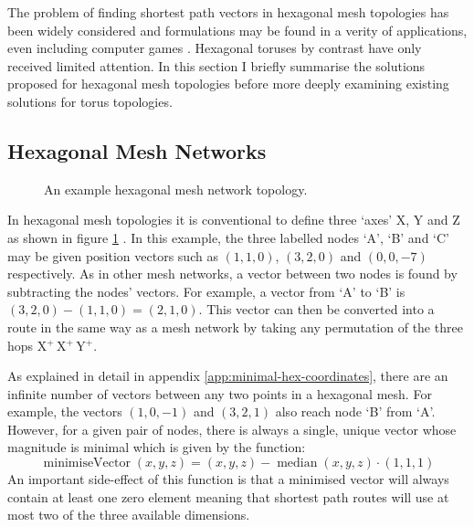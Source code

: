 		The problem of finding shortest path vectors in hexagonal mesh topologies
		has been widely considered and formulations may be found in a verity of
		applications, even including computer games \cite{patel15}. Hexagonal
		toruses by contrast have only received limited attention. In this section I
		briefly summarise the solutions proposed for hexagonal mesh topologies
		before more deeply examining existing solutions for torus topologies.
		
		\subsection{Hexagonal Mesh Networks}
			
			\begin{figure}
				\center
				\caption{An example hexagonal mesh network topology.}
				\label{fig:hex-mesh-topology-coordinates}
			\end{figure}
			
			In hexagonal mesh topologies it is conventional to define three `axes' X,
			Y and Z as shown in figure \ref{fig:hex-mesh-topology-coordinates}
			\cite{patel15}. In this example, the three labelled nodes `A', `B' and
			`C' may be given position vectors such as $(1, 1, 0)$, $(3, 2, 0)$ and
			$(0, 0, -7)$ respectively. As in other mesh networks, a vector between
			two nodes is found by subtracting the nodes' vectors. For example, a
			vector from `A' to `B' is $(3, 2, 0) - (1, 1, 0) = (2, 1, 0)$. This
			vector can then be converted into a route in the same way as a mesh
			network by taking any permutation of the three hops  X$^+\,$X$^+\,$Y$^+$.
			
			As explained in detail in appendix \ref{app:minimal-hex-coordinates},
			there are an infinite number of vectors between any two points in a
			hexagonal mesh. For example, the vectors $(1, 0, -1)$ and $(3, 2, 1)$
			also reach node `B' from `A'. However, for a given pair of nodes, there
			is always a single, unique vector whose magnitude is minimal which is
			given by the function:
			\begin{equation*} \operatorname{minimiseVector}(x,y,z) = (x,y,z) -
			\operatorname{median}(x,y,z) \cdot (1,1,1) \end{equation*}
			An important side-effect of this function is that a minimised vector will
			always contain at least one zero element meaning that shortest path
			routes will use at most two of the three available dimensions.
		
